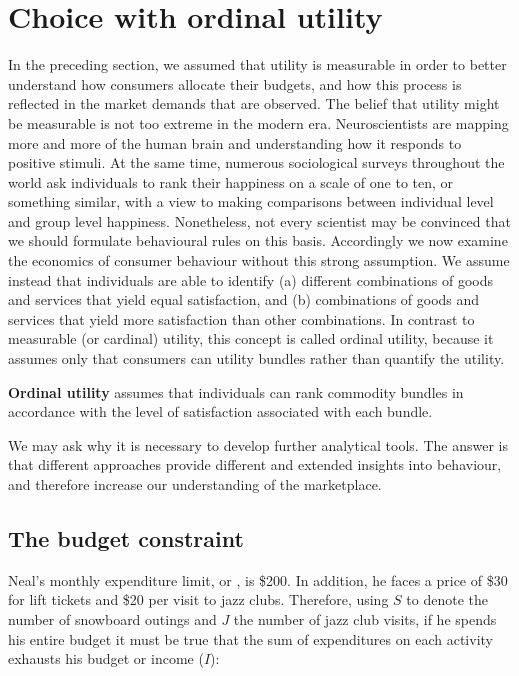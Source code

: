 \section{Choice with ordinal utility}\label{sec:ordutility}

In the preceding section, we assumed that utility is measurable in order to better understand how consumers allocate their budgets, and how this process is reflected in the market demands that are observed. The belief that utility might be measurable is not too extreme in the modern era. Neuroscientists are mapping more and more of the human brain and understanding how it responds to positive stimuli. At the same time, numerous sociological surveys throughout the world ask individuals to rank their happiness on a scale of one to ten, or something similar, with a view to making comparisons between individual level and group level happiness. Nonetheless, not every scientist may be convinced that we should formulate behavioural rules on this basis. Accordingly we now examine the economics of consumer behaviour without this strong assumption. We assume instead that individuals are able to identify (a) different combinations of goods and services that yield equal satisfaction, and (b) combinations of goods and services that yield more satisfaction than other combinations. In contrast to measurable (or cardinal) utility, this concept is called ordinal utility, because it assumes only that consumers can  utility bundles rather than quantify the utility.

\begin{DefBox}
\textbf{Ordinal utility} assumes that individuals can rank commodity bundles in accordance with the level of satisfaction associated with each bundle.
\end{DefBox}

We may ask why it is necessary to develop further analytical tools. The answer is that different approaches provide different and extended insights into behaviour, and therefore increase our understanding of the marketplace.

\subsection*{The budget constraint}

Neal's monthly expenditure limit, or , is \$200. In addition, he faces a price of \$30 for lift tickets and \$20 per visit to jazz clubs. Therefore, using $S$ to denote the number of snowboard outings and $J$ the number of jazz club visits, if he spends his entire budget it must be true that the sum of expenditures on each activity exhausts his budget or income ($I$):

